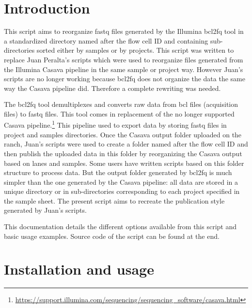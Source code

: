 \documentclass[11pt]{report}
\begin{document}



\tableofcontents



 \chapter*{Introduction}

This script aims to reorganize fastq files generated by the Illumina bcl2fq tool in a standardized directory named after the flow cell ID and containing sub-directories sorted either by samples or by projects. This script was written to replace Juan Peralta's scripts which were used to reorganize files generated from the Illumina Casava pipeline in the same sample or project way. However Juan's scripts are no longer working because bcl2fq does not organize the data the same way the Casava pipeline did. Therefore a complete rewriting was needed.

The bcl2fq tool demultiplexes and converts raw data from bcl files (acquisition files) to fastq files. This tool comes in replacement of the no longer supported Casava pipeline.\footnote{\url{https://support.illumina.com/sequencing/sequencing_software/casava.html}} This pipeline used to export data by storing fastq files in project and samples directories. Once the Casava output folder uploaded on the ranch, Juan's scripts were used to create a folder named after the flow cell ID and then publish the uploaded data in this folder by reorganizing the Casava output based on lanes and samples. Some users have written scripts based on this folder structure to process data. But the output folder generated by bcl2fq is much simpler than the one generated by the Casava pipeline: all data are stored in a unique directory or in sub-directories corresponding to each project specified in the sample sheet. The present script aims to recreate the publication style generated by Juan's scripts.

This documentation details the different options available from this script and basic usage examples. Source code of the script can be found at the end.



 \chapter*{Installation and usage}
\setcounter{section}{0}
\end{document}
